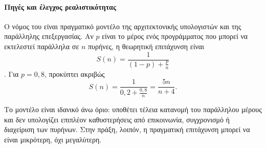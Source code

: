 \paragraph{Πηγές και έλεγχος ρεαλιστικότητας}
Ο νόμος του  είναι πραγματικό μοντέλο της αρχιτεκτονικής
υπολογιστών και της παράλληλης επεξεργασίας. Αν \(p\) είναι το μέρος
ενός προγράμματος που μπορεί να εκτελεστεί παράλληλα σε \(n\) πυρήνες,
η θεωρητική επιτάχυνση είναι
\[
  S(n)=\frac{1}{(1-p)+\frac{p}{n}}
\]
\cite{amdahlLawParallelComputing}. Για \(p=0{,}8\), προκύπτει ακριβώς
\[
  S(n)=\frac{1}{0{,}2+\frac{0{,}8}{n}}
      =\frac{5n}{n+4}.
\]

Το μοντέλο είναι ιδανικό άνω όριο: υποθέτει τέλεια κατανομή του
παράλληλου μέρους και δεν υπολογίζει επιπλέον καθυστερήσεις από
επικοινωνία, συγχρονισμό ή διαχείριση των πυρήνων. Στην πράξη, λοιπόν,
η πραγματική επιτάχυνση μπορεί να είναι μικρότερη, όχι μεγαλύτερη.
